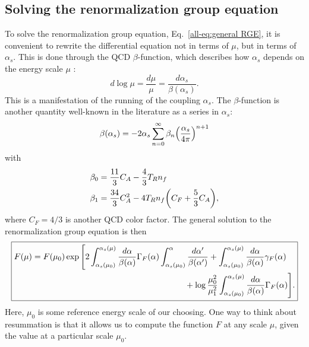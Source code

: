 \documentclass[../thesis.tex]{subfiles}
\begin{document}
\subsection{Solving the renormalization group equation}\label{all-sec:solving RGE}
	To solve the renormalization group equation, Eq.~\ref{all-eq:general RGE}, it is convenient to rewrite the differential equation not in terms of $\mu$, but in terms of $\alpha_s$. This is done through the QCD $\beta$-function, which describes how $\alpha_s$ depends on the energy scale $\mu$ \cite{frye_factorization_2016}:
	\begin{equation}\label{all-eq:beta function definition}
		d\log\mu = \frac{d\mu}{\mu} = \frac{d\alpha_s}{\beta(\alpha_s)}.
	\end{equation}
	This is a manifestation of the running of the coupling $\alpha_s$. The $\beta$-function is another quantity well-known in the literature as a series in $\alpha_s$:
	\begin{equation}
		\beta(\alpha_s) = -2\alpha_s \sum_{n = 0}^\infty \beta_n \qty(\frac{\alpha_s}{4\pi})^{n + 1}
	\end{equation}
	with \cite{frye_factorization_2016}
	\begin{equation}
	\begin{aligned}
		\beta_0 &= \frac{11}{3} C_A - \frac{4}{3}T_R n_f \\
		\beta_1 &= \frac{34}{3} C_A^2 - 4 T_R n_f \qty(C_F + \frac{5}{3} C_A),
	\end{aligned}
	\end{equation}
	where $C_F = 4/3$ is another QCD color factor. The general solution to the renormalization group equation is then \cite{frye_factorization_2016}
	\begin{equation}\label{all-eq:RGE general solution}
	\boxed{
	\begin{aligned}
		F(\mu) = F(\mu_0) \exp\Bigg[ 2 \int_{\alpha_s(\mu_0)}^{\alpha_s(\mu)} \frac{d\alpha}{\beta(\alpha)}\Gamma_F(\alpha) \int_{\alpha_s(\mu_0)}^\alpha \frac{d\alpha'}{\beta(\alpha')} &+ \int_{\alpha_s(\mu_0)}^{\alpha_s(\mu)} \frac{d\alpha}{\beta(\alpha)}\gamma_F(\alpha) \\
		&\hspace{-1cm}+ \log\frac{\mu_0^2}{\mu_1^2} \int_{\alpha_s(\mu_0)}^{\alpha_s(\mu)} \frac{d\alpha}{\beta(\alpha)}\Gamma_F(\alpha) \Bigg].
	\end{aligned}
	}
	\end{equation}
	Here, $\mu_0$ is some reference energy scale of our choosing. One way to think about resummation is that it allows us to compute the function $F$ at any scale $\mu$, given the value at a particular scale $\mu_0$.
\end{document}

